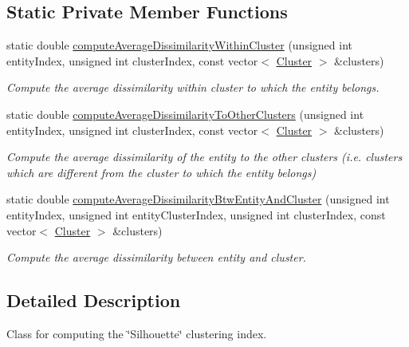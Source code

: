 \subsection*{\-Static \-Private \-Member \-Functions}
\begin{DoxyCompactItemize}
\item 
static double \hyperlink{classmultiscale_1_1analysis_1_1Silhouette_a9cfc58c766daf74d57c0f109f2e77639}{compute\-Average\-Dissimilarity\-Within\-Cluster} (unsigned int entity\-Index, unsigned int cluster\-Index, const vector$<$ \hyperlink{classmultiscale_1_1analysis_1_1Cluster}{\-Cluster} $>$ \&clusters)
\begin{DoxyCompactList}\small\item\em \-Compute the average dissimilarity within cluster to which the entity belongs. \end{DoxyCompactList}\item 
static double \hyperlink{classmultiscale_1_1analysis_1_1Silhouette_a32876a9d476298d1835486a334eee44f}{compute\-Average\-Dissimilarity\-To\-Other\-Clusters} (unsigned int entity\-Index, unsigned int cluster\-Index, const vector$<$ \hyperlink{classmultiscale_1_1analysis_1_1Cluster}{\-Cluster} $>$ \&clusters)
\begin{DoxyCompactList}\small\item\em \-Compute the average dissimilarity of the entity to the other clusters (i.\-e. clusters which are different from the cluster to which the entity belongs) \end{DoxyCompactList}\item 
static double \hyperlink{classmultiscale_1_1analysis_1_1Silhouette_aac5c29405d0407da2f21ffac016bfd01}{compute\-Average\-Dissimilarity\-Btw\-Entity\-And\-Cluster} (unsigned int entity\-Index, unsigned int entity\-Cluster\-Index, unsigned int cluster\-Index, const vector$<$ \hyperlink{classmultiscale_1_1analysis_1_1Cluster}{\-Cluster} $>$ \&clusters)
\begin{DoxyCompactList}\small\item\em \-Compute the average dissimilarity between entity and cluster. \end{DoxyCompactList}\end{DoxyCompactItemize}


\subsection{\-Detailed \-Description}
\-Class for computing the \char`\"{}\-Silhouette\char`\"{} clustering index. 

